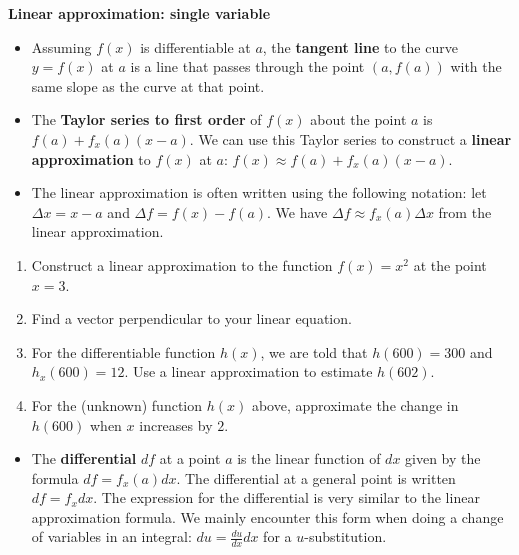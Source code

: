 \documentclass[12pt,letterpaper,noanswers]{exam}
\begin{document}
\noindent\textbf{Linear approximation: single variable}
\begin{tcolorbox}
\begin{itemize}
\itemsep0em
    \item Assuming $f(x)$ is differentiable at $a$, the \textbf{tangent line} to the curve $y=f(x)$ at $a$ is a line that passes through the point $(a,f(a))$ with the same slope as the curve at that point.
\item The \textbf{Taylor series to first order} of $f(x)$ about the point $a$ is $f(a) + f_x(a)(x-a).$  We can use this Taylor series to construct a \textbf{linear approximation} to $f(x)$ at $a$: $f(x) \approx f(a) + f_x(a)(x-a)$.
\item The linear approximation is often written using the following notation: let $\Delta x = x - a$ and $\Delta f = f(x) - f(a)$.  We have $\Delta f \approx f_x(a) \Delta x$ from the linear approximation.
\end{itemize}
\end{tcolorbox}
\begin{enumerate}
    \item Construct a linear approximation to the function $f(x) = x^2$ at the point $x=3$.
\vspace{1in}

\item Find a vector perpendicular to your linear equation.
\vspace{1in}

\item For the differentiable function $h(x)$, we are told that $h(600) = 300$ and $h_x(600) = 12.$  Use a linear approximation to estimate $h(602)$.
\vspace{0.5in}

\item For the (unknown) function $h(x)$ above, approximate the change in $h(600)$ when $x$ increases by $2$.
\vspace{0.5in}

\end{enumerate}



\begin{tcolorbox}
\begin{itemize}
\itemsep0em
\item The \textbf{differential} $df$ at a point $a$ is the linear function of $dx$ given by the formula $df = f_x(a) dx$.  The differential at a general point is written $df = f_xdx.$  The expression for the differential is very similar to the linear approximation formula.  We mainly encounter this form when doing a change of variables in an integral:  $du = \frac{du}{dx}dx$ for a $u$-substitution.
\end{itemize}
\end{tcolorbox}
\end{document}
